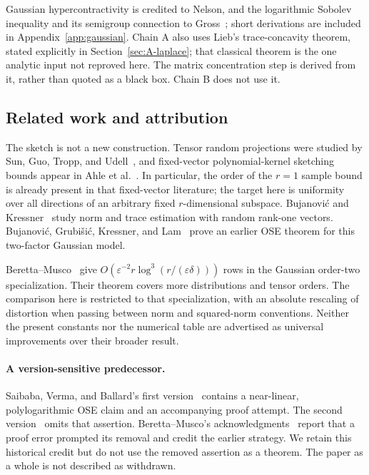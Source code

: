 \documentclass[11pt]{article}
\numberwithin{equation}{section}
\theoremstyle{definition}\newtheorem{definition}[theorem]{Definition}
\theoremstyle{remark}\newtheorem{remark}[theorem]{Remark}
\begin{document}
Gaussian hypercontractivity is credited to Nelson, and the logarithmic Sobolev
inequality and its semigroup connection to Gross~\cite{Nelson,Gross,GrossSurvey}; short derivations are included in
Appendix~\ref{app:gaussian}. Chain A also uses Lieb's trace-concavity theorem, stated
explicitly in Section~\ref{sec:A-laplace}; that classical theorem is the one analytic
input not reproved here. The matrix concentration step is derived from it, rather
than quoted as a black box. Chain B does not use it.

\clearpage
\subsection{Related work and attribution}\label{sec:attribution-intro}
The sketch is not a new construction. Tensor random projections were studied by
Sun, Guo, Tropp, and Udell~\cite{Sun}, and fixed-vector polynomial-kernel sketching
bounds appear in Ahle et al.~\cite[Appendix~A.2, Theorem~42]{Ahle}.
In particular, the order of the $r=1$ sample bound is already present in that
fixed-vector literature; the target
here is uniformity over all directions of an arbitrary fixed $r$-dimensional
subspace. Bujanovi\'c and Kressner~\cite{BK} study norm and trace estimation with
random rank-one vectors. Bujanovi\'c, Grubi\v{s}i\'c, Kressner, and
Lam~\cite{BGKL} prove an earlier OSE theorem for this two-factor Gaussian model.

Beretta--Musco~\cite[Theorem~1.3]{BM} give
$O(\varepsilon^{-2}r\log^3(r/(\varepsilon\delta)))$ rows in the Gaussian
order-two specialization. Their theorem covers more distributions and tensor
orders. The comparison here is restricted to that specialization, with an
absolute rescaling of distortion when passing between norm and squared-norm
conventions. Neither the present constants nor the numerical table are advertised
as universal improvements over their broader result.

\paragraph{A version-sensitive predecessor.}
Saibaba, Verma, and Ballard's first version~\cite[Theorem~11]{SVBv1}
contains a near-linear, polylogarithmic OSE claim and an accompanying proof
attempt. The second version~\cite{SVBv2} omits that assertion. Beretta--Musco's
acknowledgments~\cite{BM} report that a proof error prompted its removal and
credit the earlier strategy. We retain this historical credit but do not use the
removed assertion as a theorem. The paper as a whole is not described as withdrawn.
\end{document}

